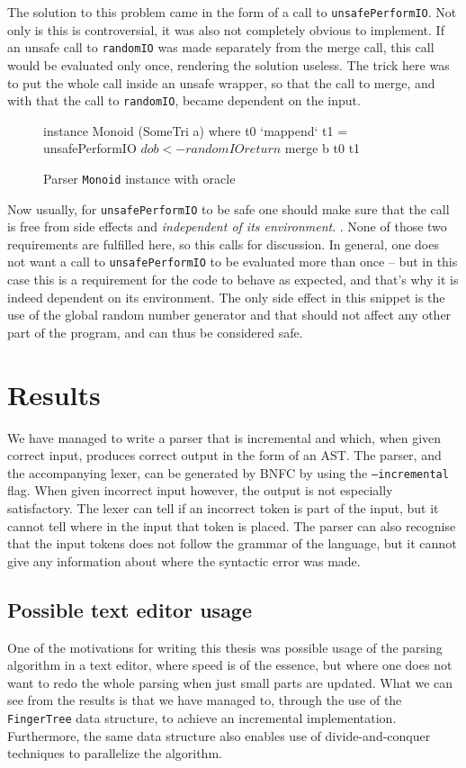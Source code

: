 \documentclass[a4paper,12pt,twosided]{report}
\renewcommand\cite{\citep}
\begin{document}
The solution to this problem came in the form of a call to
\texttt{unsafePerformIO}.  Not only is this is controversial, it was also not
completely obvious to implement. If an unsafe call to \texttt{randomIO} was made
separately from the merge call, this call would be evaluated only once,
rendering the solution useless. The trick here was to put the whole call inside
an unsafe wrapper, so that the call to merge, and with that the call to
\texttt{randomIO}, became dependent on the input.

\begin{figure}[H]
\begin{code}
instance Monoid (SomeTri a) where
    t0 `mappend` t1 = unsafePerformIO $ do
      b <- randomIO
      return $ merge b t0 t1
\end{code}
\caption{Parser \texttt{Monoid} instance with oracle}
\end{figure}

Now usually, for \texttt{unsafePerformIO} to be safe one should make sure that
the call is free from side effects and \textit{independent of its environment}.
\cite{unsafeHackage}. None of those two requirements are fulfilled here, so 
this calls for discussion. In general, one does not want a call to
\texttt{unsafePerformIO} to be evaluated more than once -- but in this case this
is a requirement for the code to behave as expected, and that's why it is indeed
dependent on its environment. The only side effect in this snippet is the use of
the global random number generator and that should not affect any other part of
the program, and can thus be considered safe.

%
%

\chapter{Results}
We have managed to write a parser that is incremental and which, when given
correct input, produces correct output in the form of an AST. The parser, and
the accompanying lexer, can be generated by BNFC by using the
\texttt{---incremental} flag. When given incorrect input however, the output is
not especially satisfactory. The lexer can tell if an incorrect token is part of
the input, but it cannot tell where in the input that token is placed. The
parser can also recognise that the input tokens does not follow the grammar of
the language, but it cannot give any information about where the syntactic error
was made.

\section{Possible text editor usage}
One of the motivations for writing this thesis was possible usage of the parsing
algorithm in a text editor, where speed is of the essence, but where one does
not want to redo the whole parsing when just small parts are updated. What we
can see from the results is that we have managed to, through the use of the
\texttt{FingerTree} data structure, to achieve an incremental implementation.
Furthermore, the same data structure also enables use of divide-and-conquer
techniques to parallelize the algorithm. 
\end{document}
